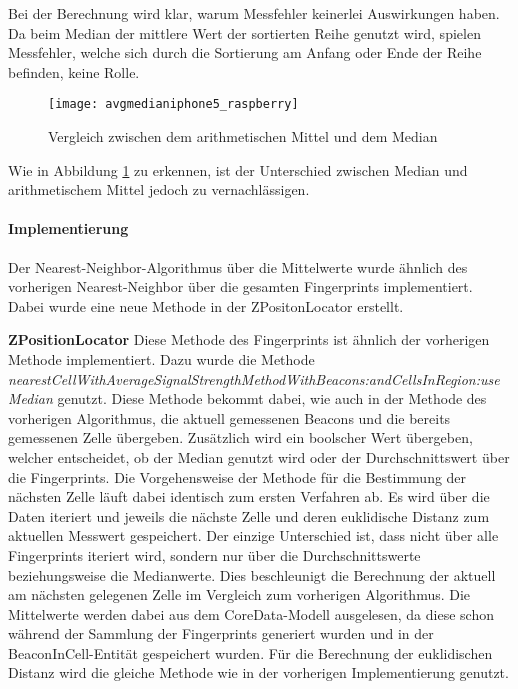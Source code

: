 Bei der Berechnung wird klar, warum Messfehler keinerlei Auswirkungen haben. Da beim Median der mittlere Wert der sortierten Reihe genutzt wird, spielen Messfehler, welche sich durch die Sortierung am Anfang oder Ende der Reihe befinden, keine Rolle.

\begin{figure}[htb!]
		\centering
	\texttt{[image: avgmedianiphone5\_raspberry]}
	\caption{Vergleich zwischen dem arithmetischen Mittel und dem Median}
	\label{avgmedianiphone5_raspberry}
\end{figure}

Wie in Abbildung \ref{avgmedianiphone5_raspberry} zu erkennen, ist der Unterschied zwischen Median und arithmetischem Mittel jedoch zu vernachlässigen. 

\paragraph{Implementierung}
\label{sec:implementation:fingerprinting:positioning:avg:implementiation}
Der Nearest-Neighbor-Algorithmus über die Mittelwerte wurde ähnlich des vorherigen Nearest-Neighbor über die gesamten Fingerprints implementiert. Dabei wurde eine neue Methode in der ZPositonLocator erstellt.


\textbf{ZPositionLocator}
Diese Methode des Fingerprints ist ähnlich der vorherigen Methode implementiert. Dazu wurde die Methode \emph{nearestCellWithAverageSignalStrengthMethodWithBeacons:andCellsInRegion:useMedian} genutzt. Diese Methode bekommt dabei, wie auch in der Methode des vorherigen Algorithmus, die aktuell gemessenen Beacons und die bereits gemessenen Zelle übergeben. Zusätzlich wird ein boolscher Wert übergeben, welcher entscheidet, ob der Median genutzt wird oder der Durchschnittswert über die Fingerprints.
Die Vorgehensweise der Methode für die Bestimmung der nächsten Zelle läuft dabei identisch zum ersten Verfahren ab. Es wird über die Daten iteriert und jeweils die nächste Zelle und deren euklidische Distanz zum aktuellen Messwert gespeichert. Der einzige Unterschied ist, dass nicht über alle Fingerprints iteriert wird, sondern nur über die Durchschnittswerte beziehungsweise die Medianwerte. Dies beschleunigt die Berechnung der aktuell am nächsten gelegenen Zelle im Vergleich zum vorherigen Algorithmus. 
Die Mittelwerte werden dabei aus dem CoreData-Modell ausgelesen, da diese schon während der Sammlung der Fingerprints generiert wurden und in der BeaconInCell-Entität gespeichert wurden. 
Für die Berechnung der euklidischen Distanz wird die gleiche Methode wie in der vorherigen Implementierung genutzt.

